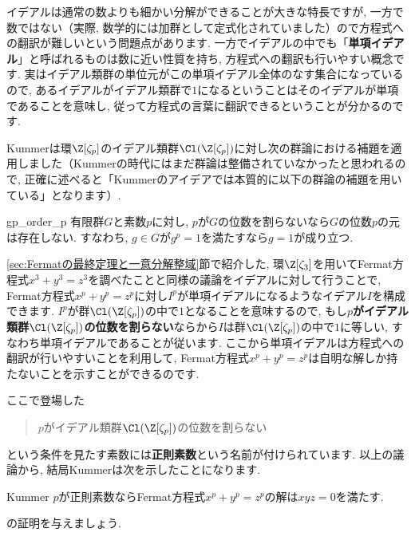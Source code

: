\documentclass[11pt,b5paper,oneside,titlepage,lualatex]{ltjsreport}
\begin{document}
イデアルは通常の数よりも細かい分解ができることが大きな特長ですが, 一方で数ではない（実際, 数学的には加群として定式化されていました）ので方程式への翻訳が難しいという問題点があります. 
一方でイデアルの中でも「\textbf{単項イデアル}」と呼ばれるものは数に近い性質を持ち, 方程式への翻訳も行いやすい概念です. 
実はイデアル類群の単位元がこの単項イデアル全体のなす集合になっているので, あるイデアルがイデアル類群で$ 1 $になるということはそのイデアルが単項であることを意味し, 従って方程式の言葉に翻訳できるということが分かるのです. 

Kummerは環$ \Z[\zeta_p] $のイデアル類群$ \Cl(\Z[\zeta_p]) $に対し次の群論における補題を適用しました（Kummerの時代にはまだ群論は整備されていなかったと思われるので, 正確に述べると「Kummerのアイデアでは本質的に以下の群論の補題を用いている」となります）. 

\begin{lem}{}{gp_order_p}
	有限群$ G $と素数$ p $に対し, $ p $が$ G $の位数を割らないなら$ G $の位数$ p $の元は存在しない. 
	すなわち, $ g \in G $が$ g^p = 1 $を満たすなら$ g = 1 $が成り立つ. 
\end{lem}

\ref{sec:Fermatの最終定理と一意分解整域}節で紹介した, 環$ \Z[\zeta_3] $を用いてFermat方程式$ x^3 + y^3 = z^3 $を調べたことと同様の議論をイデアルに対して行うことで, Fermat方程式$ x^p + y^p = z^p $に対し$ I^p $が単項イデアルになるようなイデアル$ I $を構成できます. 
$ I^p $が群$ \Cl(\Z[\zeta_p]) $の中で$ 1 $となることを意味するので, もし\textbf{$ p $がイデアル類群$ \Cl(\Z[\zeta_p]) $の位数を割らない}ならから$ I $は群$ \Cl(\Z[\zeta_p]) $の中で$ 1 $に等しい, すなわち単項イデアルであることが従います. 
ここから単項イデアルは方程式への翻訳が行いやすいことを利用して, Fermat方程式$ x^p + y^p = z^p $は自明な解しか持たないことを示すことができるのです. 

ここで登場した
\begin{quote}
	\centering
	$ p $がイデアル類群$ \Cl(\Z[\zeta_p]) $の位数を割らない
\end{quote}
という条件を見たす素数には\textbf{正則素数}という名前が付けられています. 
以上の議論から, 結局Kummerは次を示したことになります. 

\begin{thm}{Kummer}{}
	$ p $が正則素数ならFermat方程式$ x^p + y^p = z^p $の解は$ xyz = 0 $を満たす. 
\end{thm}


\begin{exc}{}{}
	の証明を与えましょう. 
\end{exc}
\end{document}

